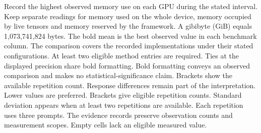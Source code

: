 \begin{table}[!htp]
\begin{minipage}{\linewidth}
Record the highest observed memory use on each GPU during the stated interval. Keep separate readings for memory used on the whole device, memory occupied by live tensors and memory reserved by the framework. A gibibyte (GiB) equals 1,073,741,824 bytes.
The bold mean is the best observed value in each benchmark column. The comparison covers the recorded implementations under their stated configurations. At least two eligible method entries are required. Ties at the displayed precision share bold formatting. Bold formatting conveys an observed comparison and makes no statistical-significance claim. Brackets show the available repetition count. Response differences remain part of the interpretation. Lower values are preferred.
Brackets give eligible repetition counts. Standard deviation appears when at least two repetitions are available. Each repetition uses three prompts. The evidence records preserve observation counts and measurement scopes. Empty cells lack an eligible measured value.
\end{minipage}
\end{table}

